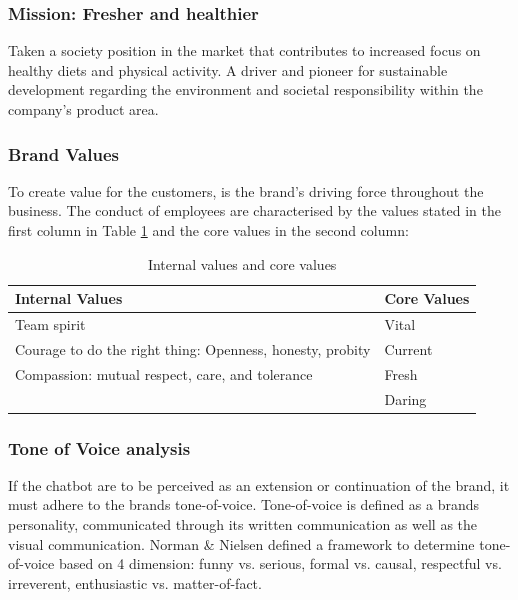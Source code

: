 \vspace{2,5mm}
  
        \subsubsection{Mission: Fresher and healthier}
        Taken a society position in the  market that contributes to increased focus on healthy diets and physical activity. A driver and pioneer for sustainable development regarding the environment and societal responsibility within the company’s product area.
        
\vspace{2,5mm}

        \subsubsection{Brand Values}
        
        To create value for the customers, is the brand's driving force throughout the business. The conduct of employees are characterised by the values stated in the first column in Table \ref{table:1} and the core values in the second column:
        
    \begin{table}[h]
    \begin{tabular}{ |p{9cm}||p{}|  }
     \hline
     Internal Values & Core Values \\
     \hline
        Team spirit & Vital \\
        Courage to do the right thing: Openness, honesty, probity & Current\\
        Compassion: mutual respect, care, and tolerance & Fresh \\
        & Daring    \\
     \hline
    \end{tabular}
    \caption{Internal values and core values}
    \label{table:1}
    \end{table}

    \subsubsection{Tone of Voice analysis}
    
    If the chatbot are to be perceived as an extension or continuation of the brand, it must adhere to the brands tone-of-voice. Tone-of-voice is defined as a brands personality, communicated through its written communication as well as the visual communication. Norman \& Nielsen \citep{meyer-2016} defined a framework to determine tone-of-voice based on 4 dimension: funny vs. serious, formal vs. causal, respectful vs. irreverent, enthusiastic vs. matter-of-fact.
    
